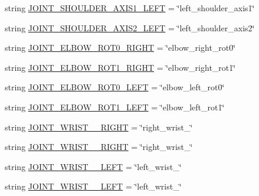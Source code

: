 \begin{DoxyCompactItemize}
string \mbox{\hyperlink{namespaceinterpolate__multiple__steering_aa0dd9eadec97651bd427b0b2e3625462}{J\+O\+I\+N\+T\+\_\+\+S\+H\+O\+U\+L\+D\+E\+R\+\_\+\+A\+X\+I\+S1\+\_\+\+L\+E\+FT}} = \char`\"{}left\+\_\+shoulder\+\_\+axis1\char`\"{}
\item 
string \mbox{\hyperlink{namespaceinterpolate__multiple__steering_aa4cc43584ee9a3af113c5f8842b436f1}{J\+O\+I\+N\+T\+\_\+\+S\+H\+O\+U\+L\+D\+E\+R\+\_\+\+A\+X\+I\+S2\+\_\+\+L\+E\+FT}} = \char`\"{}left\+\_\+shoulder\+\_\+axis2\char`\"{}
\item 
string \mbox{\hyperlink{namespaceinterpolate__multiple__steering_a85e895187541a81013fd48170b8b7144}{J\+O\+I\+N\+T\+\_\+\+E\+L\+B\+O\+W\+\_\+\+R\+O\+T0\+\_\+\+R\+I\+G\+HT}} = \char`\"{}elbow\+\_\+right\+\_\+rot0\char`\"{}
\item 
string \mbox{\hyperlink{namespaceinterpolate__multiple__steering_a4cb7b2c15fccb8da842ae1166f2ff3dc}{J\+O\+I\+N\+T\+\_\+\+E\+L\+B\+O\+W\+\_\+\+R\+O\+T1\+\_\+\+R\+I\+G\+HT}} = \char`\"{}elbow\+\_\+right\+\_\+rot1\char`\"{}
\item 
string \mbox{\hyperlink{namespaceinterpolate__multiple__steering_acae05f6a10a916bd64cc4a25da58a031}{J\+O\+I\+N\+T\+\_\+\+E\+L\+B\+O\+W\+\_\+\+R\+O\+T0\+\_\+\+L\+E\+FT}} = \char`\"{}elbow\+\_\+left\+\_\+rot0\char`\"{}
\item 
string \mbox{\hyperlink{namespaceinterpolate__multiple__steering_a136f9fa2c6f4adaca43039377a58dc9d}{J\+O\+I\+N\+T\+\_\+\+E\+L\+B\+O\+W\+\_\+\+R\+O\+T1\+\_\+\+L\+E\+FT}} = \char`\"{}elbow\+\_\+left\+\_\+rot1\char`\"{}
\item 
string \mbox{\hyperlink{namespaceinterpolate__multiple__steering_aa776da32cba31014b0fe61f1c44b42b4}{J\+O\+I\+N\+T\+\_\+\+W\+R\+I\+S\+T\+\_\+\_\+\+R\+I\+G\+HT}} = \char`\"{}right\+\_\+wrist\+\_\char`\"{}
\item 
string \mbox{\hyperlink{namespaceinterpolate__multiple__steering_a5a2b0301aa31277a01e88b61171c250c}{J\+O\+I\+N\+T\+\_\+\+W\+R\+I\+S\+T\+\_\+\_\+\+R\+I\+G\+HT}} = \char`\"{}right\+\_\+wrist\+\_\char`\"{}
\item 
string \mbox{\hyperlink{namespaceinterpolate__multiple__steering_ad05ff134641b7467c7837813c5dd8476}{J\+O\+I\+N\+T\+\_\+\+W\+R\+I\+S\+T\+\_\+\_\+\+L\+E\+FT}} = \char`\"{}left\+\_\+wrist\+\_\char`\"{}
\item 
string \mbox{\hyperlink{namespaceinterpolate__multiple__steering_a7a6dc2037a73b37ed3bf069722375f73}{J\+O\+I\+N\+T\+\_\+\+W\+R\+I\+S\+T\+\_\+\_\+\+L\+E\+FT}} = \char`\"{}left\+\_\+wrist\+\_\char`\"{}
\item 

\end{DoxyCompactItemize}

